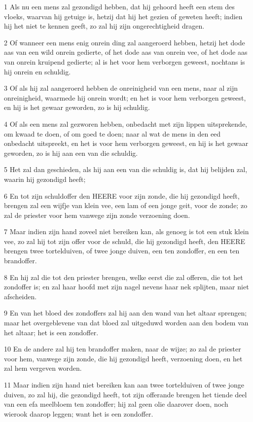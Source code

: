 \par 1 Als nu een mens zal gezondigd hebben, dat hij gehoord heeft een stem des vloeks, waarvan hij getuige is, hetzij dat hij het gezien of geweten heeft; indien hij het niet te kennen geeft, zo zal hij zijn ongerechtigheid dragen.
\par 2 Of wanneer een mens enig onrein ding zal aangeroerd hebben, hetzij het dode aas van een wild onrein gedierte, of het dode aas van onrein vee, of het dode aas van onrein kruipend gedierte; al is het voor hem verborgen geweest, nochtans is hij onrein en schuldig.
\par 3 Of als hij zal aangeroerd hebben de onreinigheid van een mens, naar al zijn onreinigheid, waarmede hij onrein wordt; en het is voor hem verborgen geweest, en hij is het gewaar geworden, zo is hij schuldig.
\par 4 Of als een mens zal gezworen hebben, onbedacht met zijn lippen uitsprekende, om kwaad te doen, of om goed te doen; naar al wat de mens in den eed onbedacht uitspreekt, en het is voor hem verborgen geweest, en hij is het gewaar geworden, zo is hij aan een van die schuldig.
\par 5 Het zal dan geschieden, als hij aan een van die schuldig is, dat hij belijden zal, waarin hij gezondigd heeft;
\par 6 En tot zijn schuldoffer den HEERE voor zijn zonde, die hij gezondigd heeft, brengen zal een wijfje van klein vee, een lam of een jonge geit, voor de zonde; zo zal de priester voor hem vanwege zijn zonde verzoening doen.
\par 7 Maar indien zijn hand zoveel niet bereiken kan, als genoeg is tot een stuk klein vee, zo zal hij tot zijn offer voor de schuld, die hij gezondigd heeft, den HEERE brengen twee tortelduiven, of twee jonge duiven, een ten zondoffer, en een ten brandoffer.
\par 8 En hij zal die tot den priester brengen, welke eerst die zal offeren, die tot het zondoffer is; en zal haar hoofd met zijn nagel nevens haar nek splijten, maar niet afscheiden.
\par 9 En van het bloed des zondoffers zal hij aan den wand van het altaar sprengen; maar het overgeblevene van dat bloed zal uitgeduwd worden aan den bodem van het altaar; het is een zondoffer.
\par 10 En de andere zal hij ten brandoffer maken, naar de wijze; zo zal de priester voor hem, vanwege zijn zonde, die hij gezondigd heeft, verzoening doen, en het zal hem vergeven worden.
\par 11 Maar indien zijn hand niet bereiken kan aan twee tortelduiven of twee jonge duiven, zo zal hij, die gezondigd heeft, tot zijn offerande brengen het tiende deel van een efa meelbloem ten zondoffer; hij zal geen olie daarover doen, noch wierook daarop leggen; want het is een zondoffer.
